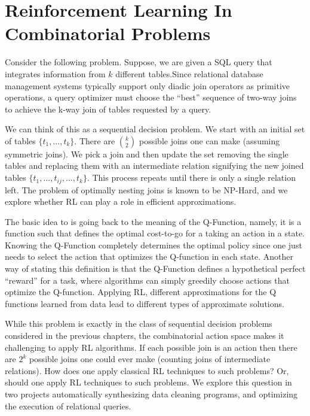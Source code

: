\chapter{Reinforcement Learning In Combinatorial Problems}
Consider the following problem. Suppose, we are given a SQL query that integrates information from $k$ different tables.Since relational database management systems typically support only diadic join operators as primitive operations, a query optimizer must choose the ``best'' sequence of two-way joins to achieve the k-way join of
tables requested by a query. 

We can think of this as a sequential decision problem. We start with an initial set of tables $\{t_1,...,t_k\}$. There are $\binom{k}{2}$ possible joins one can make (assuming symmetric joins).
We pick a join and then update the set removing the single tables and replacing them with an intermediate relation signifying the new joined tables $\{t_1,...,t_{ij},...,t_k\}$. This process repeats until there is only a single relation left. The problem of optimally nesting joins is known to be NP-Hard, and we explore whether RL can play a role in efficient approximations.

The basic idea to is going back to the meaning of the Q-Function, namely, it is a function such that defines the optimal cost-to-go for a taking an action in a state. Knowing the Q-Function completely determines the optimal policy since one just needs to select the action that optimizes the Q-function in each state. Another way of stating this definition is that the Q-Function defines a hypothetical perfect ``reward'' for a task, where algorithms can simply greedily choose actions that optimize the Q-function. Applying RL, different approximations for the Q functions learned from data lead to different types of approximate solutions.

While this problem is exactly in the class of sequential decision problems considered in the previous chapters, the combinatorial action space makes it challenging to apply RL algorithms. If each possible join is an action then there are $2^{k}$ possible joins one could ever make (counting joins of intermediate relations). How does one apply classical RL techniques to such problems? Or, should one apply RL techniques to such problems.
We explore this question in two projects automatically synthesizing data cleaning programs, and optimizing the execution of relational queries.

